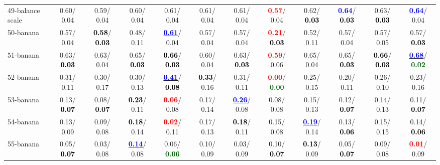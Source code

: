 \begin{table}[h]
\begin{center}
{\begin{tabular}{lc|c|c|c|c|c|c|c|c|c|c}
49-balance scale &   0.60/  0.04 &   0.59/  0.04 &   0.60/  0.04 &   0.61/  0.04 &   0.61/  0.04 &   0.61/  0.04 & \textcolor{red}{\textbf{  0.57}}/  0.04 &   0.62/\textcolor{black}{\textbf{  0.03}} & \textcolor{blue}{\textbf{  0.64}}/\textcolor{black}{\textbf{  0.03}} &   0.63/\textcolor{black}{\textbf{  0.03}} & \textcolor{blue}{\textbf{  0.64}}/  0.04 \\
50-banana &   0.57/  0.04 & \textcolor{black}{\textbf{  0.58}}/\textcolor{black}{\textbf{  0.03}} &   0.48/  0.11 & \underline{\textcolor{blue}{\textbf{  0.61}}}/  0.04 &   0.57/  0.04 &   0.57/  0.04 & \textcolor{red}{\textbf{  0.21}}/\textcolor{black}{\textbf{  0.03}} &   0.52/  0.11 &   0.57/  0.04 &   0.57/  0.05 &   0.57/\textcolor{black}{\textbf{  0.03}} \\
51-banana &   0.63/\textcolor{black}{\textbf{  0.03}} &   0.63/  0.04 &   0.65/\textcolor{black}{\textbf{  0.03}} & \textcolor{black}{\textbf{  0.66}}/\textcolor{black}{\textbf{  0.03}} &   0.60/  0.04 &   0.63/\textcolor{black}{\textbf{  0.03}} & \textcolor{red}{\textbf{  0.59}}/  0.06 &   0.65/  0.04 &   0.65/\textcolor{black}{\textbf{  0.03}} & \textcolor{black}{\textbf{  0.66}}/\textcolor{black}{\textbf{  0.03}} & \underline{\textcolor{blue}{\textbf{  0.68}}}/\textcolor{darkgreen}{\textbf{  0.02}} \\
52-banana &   0.31/  0.11 &   0.30/  0.17 &   0.30/  0.13 & \underline{\textcolor{blue}{\textbf{  0.41}}}/\textcolor{black}{\textbf{  0.08}} & \textcolor{black}{\textbf{  0.33}}/  0.16 &   0.31/  0.11 & \textcolor{red}{\textbf{  0.00}}/\textcolor{darkgreen}{\textbf{  0.00}} &   0.25/  0.15 &   0.20/  0.11 &   0.26/  0.10 &   0.23/  0.16 \\
53-banana &   0.13/\textcolor{black}{\textbf{  0.07}} &   0.08/\textcolor{black}{\textbf{  0.07}} & \textcolor{black}{\textbf{  0.23}}/  0.11 & \textcolor{red}{\textbf{  0.06}}/  0.08 &   0.17/  0.14 & \underline{\textcolor{blue}{\textbf{  0.26}}}/  0.08 &   0.08/  0.08 &   0.15/  0.13 &   0.12/\textcolor{black}{\textbf{  0.07}} &   0.14/  0.13 &   0.11/\textcolor{black}{\textbf{  0.07}} \\ \hline
54-banana &   0.13/  0.09 &   0.09/  0.08 & \textcolor{black}{\textbf{  0.18}}/  0.14 & \textcolor{red}{\textbf{  0.02}}/  0.11 &   0.17/  0.13 & \textcolor{black}{\textbf{  0.18}}/  0.11 &   0.15/  0.08 & \underline{\textcolor{blue}{\textbf{  0.19}}}/  0.14 &   0.13/\textcolor{black}{\textbf{  0.06}} &   0.15/  0.15 &   0.14/\textcolor{black}{\textbf{  0.06}} \\
55-banana &   0.05/\textcolor{black}{\textbf{  0.07}} &   0.03/  0.08 & \underline{\textcolor{blue}{\textbf{  0.14}}}/  0.08 &   0.06/\textcolor{darkgreen}{\textbf{  0.06}} &   0.10/  0.09 &   0.03/  0.09 &   0.10/\textcolor{black}{\textbf{  0.07}} & \textcolor{black}{\textbf{  0.13}}/  0.09 &   0.05/\textcolor{black}{\textbf{  0.07}} &   0.09/  0.08 & \textcolor{red}{\textbf{  0.01}}/  0.09 \\

\end{tabular}}
\end{center}
\end{table}
